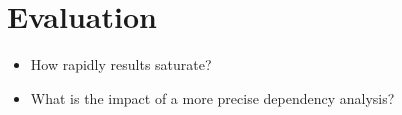 \section{Evaluation}

\begin{itemize}
\item How rapidly results saturate?
\item What is the impact of a more precise dependency analysis?
\end{itemize}
